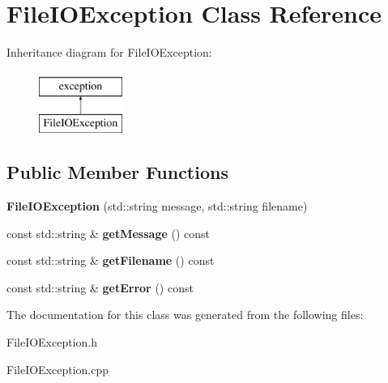 \hypertarget{classFileIOException}{}\section{File\+I\+O\+Exception Class Reference}
\label{classFileIOException}
Inheritance diagram for File\+I\+O\+Exception\+:\begin{figure}[H]
\begin{center}
\leavevmode
\includegraphics[height=2.000000cm]{df/d41/classFileIOException}
\end{center}
\end{figure}
\subsection*{Public Member Functions}
\begin{DoxyCompactItemize}
\item 
\mbox{\label{classFileIOException_a681d80fef80fa6418c0033b6e8e343b6}} 
{\bfseries File\+I\+O\+Exception} (std\+::string message, std\+::string filename)
\item 
\mbox{\label{classFileIOException_a4db7f1d7948150e26867f3f178a30f3f}} 
const std\+::string \& {\bfseries get\+Message} () const
\item 
\mbox{\label{classFileIOException_ace720469e3f7a1e69e3b5446689d1826}} 
const std\+::string \& {\bfseries get\+Filename} () const
\item 
\mbox{\label{classFileIOException_a4bd91594960e7ab9e31c1edcdc90ae5c}} 
const std\+::string \& {\bfseries get\+Error} () const
\end{DoxyCompactItemize}


The documentation for this class was generated from the following files\+:\begin{DoxyCompactItemize}
\item 
File\+I\+O\+Exception.\+h\item 
File\+I\+O\+Exception.\+cpp\end{DoxyCompactItemize}
